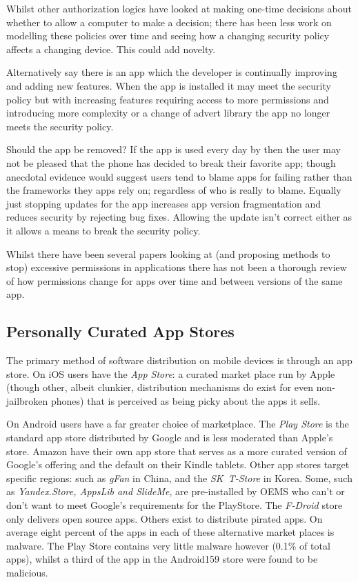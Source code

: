\documentclass[a4paper,sfsidenotes]{tufte-book}
\begin{document}
Whilst other authorization logics have looked at making one-time decisions about
whether to allow a computer to make a decision; there has been less work on
modelling these policies over time and seeing how a changing security policy
affects a changing device.  This could add novelty.

Alternatively say there is an app which the developer is continually improving
and adding new features.  When the app is installed it may meet the security
policy but with increasing features requiring access to more permissions and
introducing more complexity or a change of advert library the app no longer
meets the security policy.

Should the app be removed?  If the app is used every day by then the user may
not be pleased that the phone has decided to break their favorite
app; though anecdotal evidence would suggest users tend to blame apps
  for failing rather than the frameworks they apps rely on; regardless of who is
  really to blame. Equally just stopping updates for the app increases app
version fragmentation and reduces security by rejecting bug fixes.  Allowing the
update isn't correct either as it allows a means to break the security policy.

Whilst there have been several papers looking at (and proposing methods to stop)
excessive permissions in applications\cite{Felt:2011kj}\cite{Vidas:2011wr} there
has not been a thorough review of how permissions change for apps over time
and between versions of the same app. 



\subsection{Personally Curated App Stores}

The primary method of software distribution on mobile devices is through an app
store.  On iOS users have the \emph{App Store}: a curated market place run by
Apple (though other, albeit clunkier, distribution mechanisms do exist for even
non-jailbroken phones) that is perceived as being picky about the apps it sells.

On Android users have a far greater choice of marketplace.  The \emph{Play
  Store} is the standard app store distributed by Google and is less moderated
than Apple's store.  Amazon have their own app store that serves as a more
curated version of Google's offering and the default on their Kindle tablets.
Other app stores target specific regions: such as \emph{gFan} in China, and the
\emph{SK~T-Store} in Korea.  Some, such as \emph{Yandex.Store, AppsLib and
  SlideMe}, are pre-installed by OEMS who can't or don't want to meet Google's
requirements for the PlayStore.  The \emph{F-Droid} store only delivers open
source apps. Others exist to distribute pirated apps.  On average eight
percent\cite{AQUILINO:2013wr} of the apps in each of these alternative market
places is malware. The Play Store contains very little malware however (0.1\% of
total apps), whilst a third of the app in the Android159 store were found to be
malicious.
\end{document}
